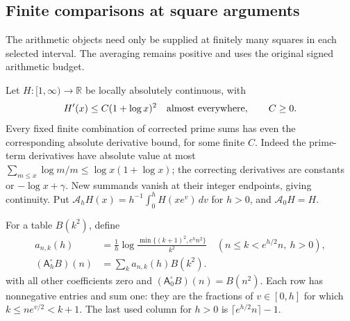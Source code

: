 \subsection{Finite comparisons at square arguments}
\label{shared-square-sampling}

The arithmetic objects need only be supplied at finitely many squares
in each selected interval. The averaging remains positive and uses the
original signed arithmetic budget.

Let \(H:[1,\infty)\to\mathbb R\) be locally absolutely continuous, with
\begin{equation}\label{shared-square-derivative}
 H'(x)\le C(1+\log x)^2\quad\hbox{almost everywhere},\qquad C\ge0.
\end{equation}
Every fixed finite combination of corrected prime sums has even the
corresponding absolute derivative bound, for some finite \(C\).
Indeed the prime-term derivatives have absolute value at most
\(\sum_{m\le x}\log m/m\le\log x(1+\log x)\);
the correcting derivatives are constants or \(-\log x+\gamma\).
New summands vanish at their integer endpoints, giving continuity.
Put \(\mathcal A_hH(x)=h^{-1}\int_0^hH(xe^v)\,dv\) for \(h>0\),
and \(\mathcal A_0H=H\).

For a table \(B(k^2)\), define
\[
 \begin{aligned}
 a_{n,k}(h)&=\frac1h
       \log\frac{\min\{(k+1)^2,e^hn^2\}}{k^2}
       \quad(n\le k<e^{h/2}n,\ h>0),\\
 (\mathsf A^\square_hB)(n)&=\sum_k a_{n,k}(h)B(k^2).
 \end{aligned}
\]
with all other coefficients zero and
\((\mathsf A^\square_0B)(n)=B(n^2)\).
Each row has nonnegative entries and sum one: they are the fractions
of \(v\in[0,h]\) for which \(k\le ne^{v/2}<k+1\).
The last used column for \(h>0\) is \(\lceil e^{h/2}n\rceil-1\).

